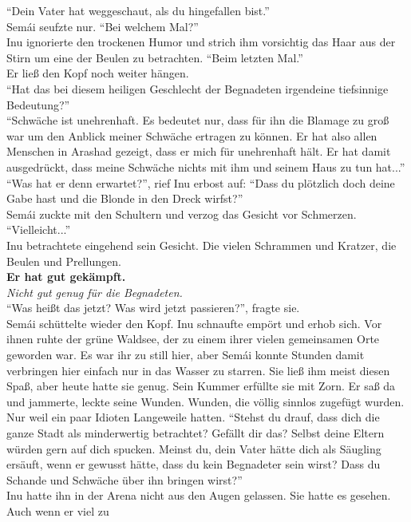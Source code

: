 ``Dein Vater hat weggeschaut, als du hingefallen bist.''\\
Semái seufzte nur. ``Bei welchem Mal?''\\
Inu ignorierte den trockenen Humor und strich ihm vorsichtig das Haar aus der Stirn um eine der 
Beulen zu betrachten. ``Beim letzten Mal.''\\
Er ließ den Kopf noch weiter hängen. \\
``Hat das bei diesem heiligen Geschlecht der Begnadeten irgendeine tiefsinnige Bedeutung?''\\
``Schwäche ist unehrenhaft. Es bedeutet nur, dass für ihn die Blamage zu groß war um den Anblick 
meiner Schwäche ertragen zu können. Er hat also allen Menschen in Arashad gezeigt, dass er mich für 
unehrenhaft hält. Er hat damit ausgedrückt, dass meine Schwäche nichts mit ihm und seinem Haus zu 
tun hat...''\\
``Was hat er denn erwartet?'', rief Inu erbost auf: ``Dass du plötzlich doch deine Gabe hast und 
die Blonde in den Dreck wirfst?''\\
Semái zuckte mit den Schultern und verzog das Gesicht vor Schmerzen. ``Vielleicht...''\\
Inu betrachtete eingehend sein Gesicht. Die vielen Schrammen und Kratzer, die Beulen und 
Prellungen.\\
\textbf{Er hat gut gekämpft.}\\
\textit{Nicht gut genug für die Begnadeten.}\\
``Was heißt das jetzt? Was wird jetzt passieren?'', fragte sie.\\
Semái schüttelte wieder den Kopf. Inu schnaufte empört und erhob sich. Vor ihnen ruhte der grüne 
Waldsee, der zu einem ihrer vielen gemeinsamen Orte geworden war. Es war ihr zu still hier, aber 
Semái konnte Stunden damit verbringen hier einfach nur in das Wasser zu starren. Sie ließ ihm meist 
diesen Spaß, aber heute hatte sie genug. Sein Kummer erfüllte sie mit Zorn. Er saß da und jammerte, 
leckte seine Wunden. Wunden, die völlig sinnlos zugefügt wurden. Nur weil ein paar Idioten 
Langeweile hatten. ``Stehst du drauf, dass dich die ganze Stadt als minderwertig betrachtet? 
Gefällt dir das? Selbst deine Eltern würden gern auf dich spucken. Meinst du, dein Vater hätte dich 
als Säugling ersäuft, wenn er gewusst hätte, dass du kein Begnadeter sein wirst? Dass du Schande und 
Schwäche über ihn bringen wirst?''\\
Inu hatte ihn in der Arena nicht aus den Augen gelassen. Sie hatte es gesehen. Auch wenn er viel zu 

